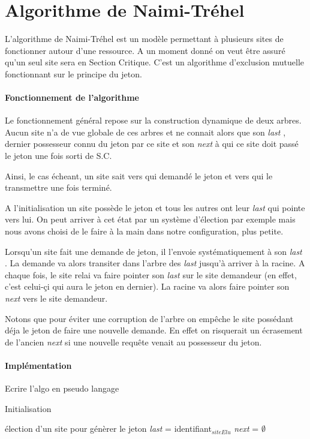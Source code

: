 \documentclass[a4paper,12pt]{article}
\newcommand{\nt}{Naimi-Tréhel }
\newcommand{\last}{\textit{last} }
\newcommand{\next}{\textit{next} }
\begin{document}
\section{Algorithme de \nt}

L'algorithme de \nt est un modèle permettant à plusieurs sites de fonctionner autour d'une ressource. A un moment donné on veut être assuré qu'un seul site sera en Section Critique. C'est un algorithme d'exclusion mutuelle fonctionnant sur le principe du jeton.

\paragraph{Fonctionnement de l'algorithme}

Le fonctionnement général repose sur la construction dynamique de deux arbres. Aucun site n'a de vue globale de ces arbres et ne connait alors que son \last, dernier possesseur connu du jeton par ce site et son \next à qui ce site doit passé le jeton une fois sorti de S.C.

Ainsi, le cas écheant, un site sait vers qui demandé le jeton et vers qui le transmettre une fois terminé.

A l'initialisation un site possède le jeton et tous les autres ont leur \last qui pointe vers lui. On peut arriver à cet état par un système d'élection par exemple mais nous avons choisi de le faire à la main dans notre configuration, plus petite.

Lorsqu'un site fait une demande de jeton, il l'envoie systématiquement à son \last. La demande va alors transiter dans l'arbre des \last jusqu'à arriver à la racine. A chaque fois, le site relai va faire pointer son \last sur le site demandeur (en effet, c'est celui-çi qui aura le jeton en dernier). La racine va alors faire pointer son \next vers le site demandeur.

Notons que pour éviter une corruption de l'arbre on empêche le site possédant déja le jeton de faire une nouvelle demande. En effet on risquerait un écrasement de l'ancien \next si une nouvelle requête venait au possesseur du jeton.


\paragraph{Implémentation}
Ecrire l'algo en pseudo langage

\begin{algorithm}[t]
\caption{Initialisation}
\label{algo_naimi_trehel_init}
\begin{algorithmic}[1]
\REQUIRE élection d'un site pour génèrer le jeton
\STATE \last = identifiant$_{siteElu}$
\STATE \next = $\emptyset$
\end{algorithmic}
\end{algorithm}
\end{document}
